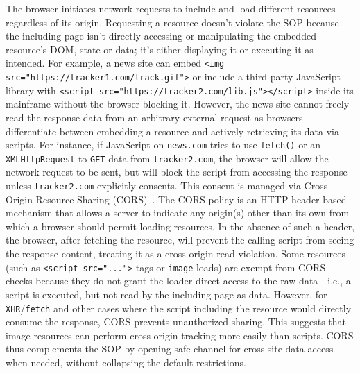 %
The browser initiates network requests to include and load different resources regardless of its origin.
%
Requesting a resource doesn’t violate the SOP because the including page isn’t directly accessing or manipulating the embedded resource’s DOM, state or data; it’s either displaying it or executing it as intended.
%
For example, a news site can embed \texttt{<img src="https://tracker1.com/track.gif">} or include a third-party JavaScript library with \texttt{<script src="https://tracker2.com/lib.js"></script>} inside its mainframe without the browser blocking it.
%
However, the news site cannot freely read the response data from an arbitrary external request as browsers differentiate between embedding a resource and actively retrieving its data via scripts.
%
For instance, if JavaScript on \texttt{news.com} tries to use \texttt{fetch()} or an \texttt{XMLHttpRequest} to \texttt{GET} data from \texttt{tracker2.com}, the browser will allow the network request to be sent, but will block the script from accessing the response unless \texttt{tracker2.com} explicitly consents.
%
This consent is managed via Cross-Origin Resource Sharing (CORS)~\cite{mdnCORS2024}.
%
The CORS policy is an HTTP-header based mechanism that allows a server to indicate any origin(s) other than its own from which a browser should permit loading resources.
%
In the absence of such a header, the browser, after fetching the resource, will prevent the calling script from seeing the response content, treating it as a cross-origin read violation.
%
Some resources (such as \texttt{<script src="...">} tags or \texttt{image} loads) are exempt from CORS checks because they do not grant the loader direct access to the raw data---i.e., a script is executed, but not read by the including page as data.
%
However, for \texttt{XHR}/\texttt{fetch} and other cases where the script including the resource would directly consume the response, CORS prevents unauthorized sharing.
%
%
%
This suggests that image resources can perform cross-origin tracking more easily than scripts.
%
CORS thus complements the SOP by opening safe channel for cross-site data access when needed, without collapsing the default restrictions.



